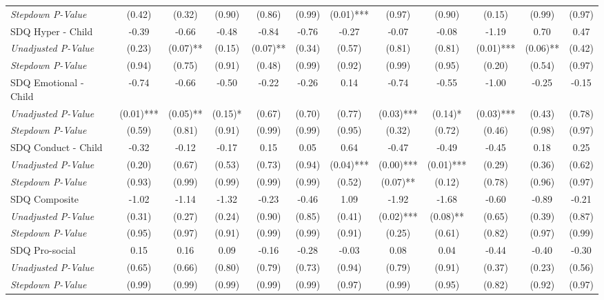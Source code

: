 \begin{tabular}{l c c c c c c c c c c c}
\quad \textit{Stepdown P-Value} & (0.42) & (0.32) & (0.90) & (0.86) & (0.99) & (0.01)*** & (0.97) & (0.90) & (0.15) & (0.99) & (0.97) \\
SDQ Hyper - Child & -0.39 & -0.66 & -0.48 & -0.84 & -0.76 & -0.27 & -0.07 & -0.08 & -1.19 & 0.70 & 0.47 \\
\quad \textit{Unadjusted P-Value} & (0.23) & (0.07)** & (0.15) & (0.07)** & (0.34) & (0.57) & (0.81) & (0.81) & (0.01)*** & (0.06)** & (0.42) \\
\quad \textit{Stepdown P-Value} & (0.94) & (0.75) & (0.91) & (0.48) & (0.99) & (0.92) & (0.99) & (0.95) & (0.20) & (0.54) & (0.97) \\
SDQ Emotional - Child & -0.74 & -0.66 & -0.50 & -0.22 & -0.26 & 0.14 & -0.74 & -0.55 & -1.00 & -0.25 & -0.15 \\
\quad \textit{Unadjusted P-Value} & (0.01)*** & (0.05)** & (0.15)* & (0.67) & (0.70) & (0.77) & (0.03)*** & (0.14)* & (0.03)*** & (0.43) & (0.78) \\
\quad \textit{Stepdown P-Value} & (0.59) & (0.81) & (0.91) & (0.99) & (0.99) & (0.95) & (0.32) & (0.72) & (0.46) & (0.98) & (0.97) \\
SDQ Conduct - Child & -0.32 & -0.12 & -0.17 & 0.15 & 0.05 & 0.64 & -0.47 & -0.49 & -0.45 & 0.18 & 0.25 \\
\quad \textit{Unadjusted P-Value} & (0.20) & (0.67) & (0.53) & (0.73) & (0.94) & (0.04)*** & (0.00)*** & (0.01)*** & (0.29) & (0.36) & (0.62) \\
\quad \textit{Stepdown P-Value} & (0.93) & (0.99) & (0.99) & (0.99) & (0.99) & (0.52) & (0.07)** & (0.12) & (0.78) & (0.96) & (0.97) \\
SDQ Composite & -1.02 & -1.14 & -1.32 & -0.23 & -0.46 & 1.09 & -1.92 & -1.68 & -0.60 & -0.89 & -0.21 \\
\quad \textit{Unadjusted P-Value} & (0.31) & (0.27) & (0.24) & (0.90) & (0.85) & (0.41) & (0.02)*** & (0.08)** & (0.65) & (0.39) & (0.87) \\
\quad \textit{Stepdown P-Value} & (0.95) & (0.97) & (0.91) & (0.99) & (0.99) & (0.91) & (0.25) & (0.61) & (0.82) & (0.97) & (0.99) \\
SDQ Pro-social & 0.15 & 0.16 & 0.09 & -0.16 & -0.28 & -0.03 & 0.08 & 0.04 & -0.44 & -0.40 & -0.30 \\
\quad \textit{Unadjusted P-Value} & (0.65) & (0.66) & (0.80) & (0.79) & (0.73) & (0.94) & (0.79) & (0.91) & (0.37) & (0.23) & (0.56) \\
\quad \textit{Stepdown P-Value} & (0.99) & (0.99) & (0.99) & (0.99) & (0.99) & (0.97) & (0.99) & (0.95) & (0.82) & (0.92) & (0.97) \\

\end{tabular}
